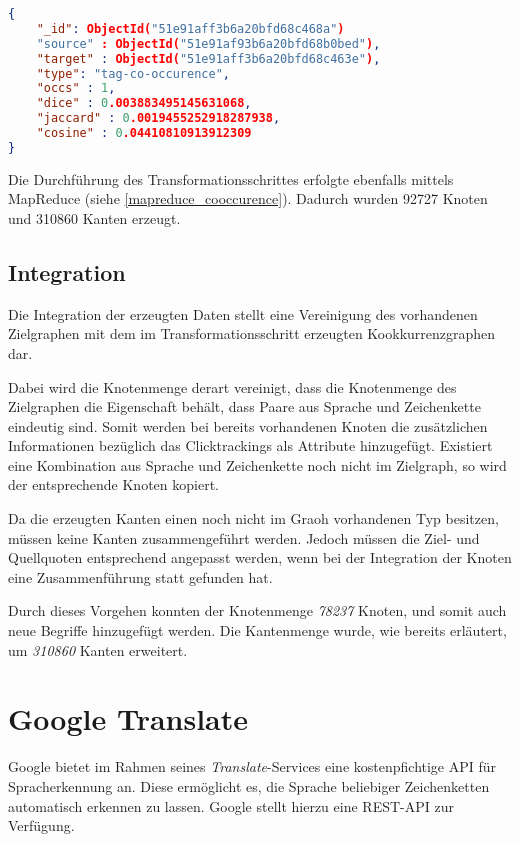 \begin{lstlisting}[language=json, label={lst:click_edge}, caption={Clicktracking-Kookkurrenzkante}]
{
    "_id": ObjectId("51e91aff3b6a20bfd68c468a")
    "source" : ObjectId("51e91af93b6a20bfd68b0bed"),
    "target" : ObjectId("51e91aff3b6a20bfd68c463e"),
    "type": "tag-co-occurence",
    "occs" : 1,
    "dice" : 0.003883495145631068,
    "jaccard" : 0.0019455252918287938,
    "cosine" : 0.04410810913912309
}
\end{lstlisting}

Die Durchführung des Transformationsschrittes erfolgte ebenfalls mittels MapReduce (siehe \ref{mapreduce_cooccurence}). Dadurch wurden \num{92727} Knoten und \num{310860} Kanten erzeugt.

\subsection{Integration}

Die Integration der erzeugten Daten stellt eine Vereinigung des vorhandenen Zielgraphen mit dem im Transformationsschritt erzeugten Kookkurrenzgraphen dar.

Dabei wird die Knotenmenge derart vereinigt, dass die Knotenmenge des Zielgraphen die Eigenschaft behält, dass Paare aus Sprache und Zeichenkette eindeutig sind. Somit werden bei bereits vorhandenen Knoten die zusätzlichen Informationen bezüglich das Clicktrackings als Attribute hinzugefügt. Existiert eine Kombination aus Sprache und Zeichenkette noch nicht im Zielgraph, so wird der entsprechende Knoten kopiert.

Da die erzeugten Kanten einen noch nicht im Graoh vorhandenen Typ besitzen, müssen keine Kanten zusammengeführt werden. Jedoch müssen die Ziel- und Quellquoten entsprechend angepasst werden, wenn bei der Integration der Knoten eine Zusammenführung statt gefunden hat.

Durch dieses Vorgehen konnten der Knotenmenge \emph{78237} Knoten, und somit auch neue Begriffe hinzugefügt werden. Die Kantenmenge wurde, wie bereits erläutert, um \emph{310860} Kanten erweitert.

\section{Google Translate}

Google bietet im Rahmen seines \emph{Translate}-Services \cite{gt2013} eine kostenpfichtige API für Spracherkennung an. Diese ermöglicht es, die Sprache beliebiger Zeichenketten automatisch erkennen zu lassen. Google stellt hierzu eine REST-API zur Verfügung.


